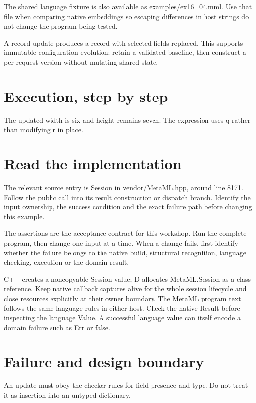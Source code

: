 The shared language fixture is also available as examples/ex16\_04.mml. Use that file when comparing native embeddings so escaping differences in host strings do not change the program being tested.

\clearpage
{}
A record update produces a record with selected fields replaced. This supports immutable configuration evolution: retain a validated baseline, then construct a per-request version without mutating shared state.


\section*{Execution, step by step}
The updated width is six and height remains seven. The expression uses q rather than modifying r in place.

\section*{Read the implementation}
The relevant source entry is Session in vendor/MetaML.hpp, around line 8171. Follow the public call into its result construction or dispatch branch. Identify the input ownership, the success condition and the exact failure path before changing this example.

The assertions are the acceptance contract for this workshop. Run the complete program, then change one input at a time. When a change fails, first identify whether the failure belongs to the native build, structural recognition, language checking, execution or the domain result.

\clearpage
{}
C++ creates a noncopyable Session value; D allocates MetaML.Session as a class reference. Keep native callback captures alive for the whole session lifecycle and close resources explicitly at their owner boundary. The MetaML program text follows the same language rules in either host. Check the native Result before inspecting the language Value. A successful language value can itself encode a domain failure such as Err or false.


\section*{Failure and design boundary}
An update must obey the checker rules for field presence and type. Do not treat it as insertion into an untyped dictionary.

